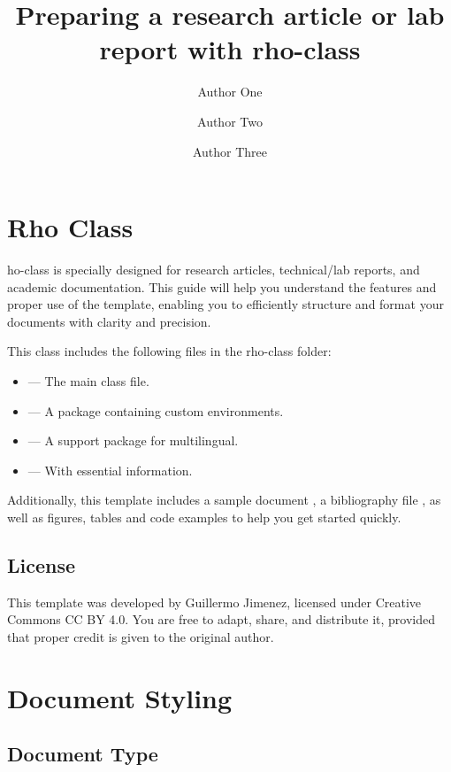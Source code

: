 \documentclass[9pt,a4paper,twocolumn,twoside]{rho-class/rho}
\title{Preparing a research article or lab report with rho-class}
\author[{\textasteriskcentered},a,1]{Author One}
\author[{\textdagger},b,2]{Author Two}
\author[{\textdagger},c,3]{Author Three}
\affil[a]{Affiliation of author one}
\affil[b]{Affiliation of author two}
\affil[c]{Affiliation of author three}
\begin{document}
    \maketitle
    \thispagestyle{firststyle}


\section{Rho Class}

    ho-class is specially designed for research articles, technical/lab reports, and academic documentation. This guide will help you understand the features and proper use of the template, enabling you to efficiently structure and format your documents with clarity and precision.

    This class includes the following files in the rho-class folder:
	
	\begin{itemize}
		\item {} — The main class file.
		\item {} — A package containing custom environments.
		\item {} — A support package for multilingual.
		\item {} — With essential information.
	\end{itemize}

    Additionally, this template includes a sample document , a bibliography file , as well as figures, tables and code examples to help you get started quickly.

    \subsection{License}

        This template was developed by Guillermo Jimenez, licensed under Creative Commons CC BY 4.0. You are free to adapt, share, and distribute it, provided that proper credit is given to the original author.

\section{Document Styling}

    \subsection{Document Type}
\end{document}
